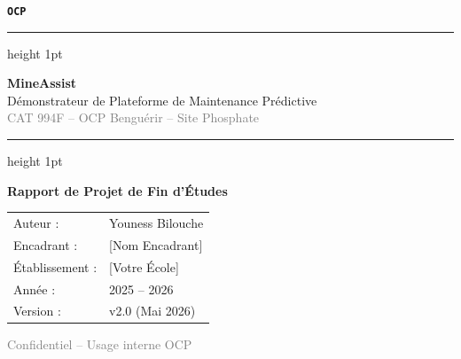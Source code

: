 \documentclass[12pt,a4paper]{report}
\begin{document}

\begin{titlepage}
  \pagecolor{ocpDark}
  \color{white}
  \centering
  \vspace*{2cm}

  \begin{tcolorbox}[
    colback=ocpGreen, colframe=ocpGold, boxrule=2pt,
    width=5cm, halign=center, valign=center, height=1.5cm
  ]
    {\Huge\bfseries\texttt{OCP}}
  \end{tcolorbox}

  \vspace{1cm}
  {\color{ocpGold}\hrule height 1pt}
  \vspace{0.5cm}

  {\fontsize{38}{46}\selectfont\bfseries\textcolor{ocpGreen}{MineAssist}}\\[0.3cm]
  {\Large\textcolor{ocpGold}{Démonstrateur de Plateforme de Maintenance Prédictive}}\\[0.2cm]
  {\large\textcolor{gray}{CAT 994F -- OCP Benguérir -- Site Phosphate}}

  \vspace{1cm}
  {\color{ocpGold}\hrule height 1pt}
  \vspace{1.5cm}

  \begin{tcolorbox}[colback=ocpDark!80, colframe=ocpGold, boxrule=1pt]
    \centering
    {\large\bfseries Rapport de Projet de Fin d'Études}\\[0.4cm]
    \begin{tabular}{ll}
      \textcolor{ocpGold}{Auteur :}      & Youness Bilouche \\[4pt]
      \textcolor{ocpGold}{Encadrant :}   & [Nom Encadrant] \\[4pt]
      \textcolor{ocpGold}{Établissement :} & [Votre École] \\[4pt]
      \textcolor{ocpGold}{Année :}       & 2025 -- 2026 \\[4pt]
      \textcolor{ocpGold}{Version :}     & v2.0 (Mai 2026) \\
    \end{tabular}
  \end{tcolorbox}

  \vfill
  {\small\textcolor{gray}{Confidentiel -- Usage interne OCP}}
\end{titlepage}
\end{document}
